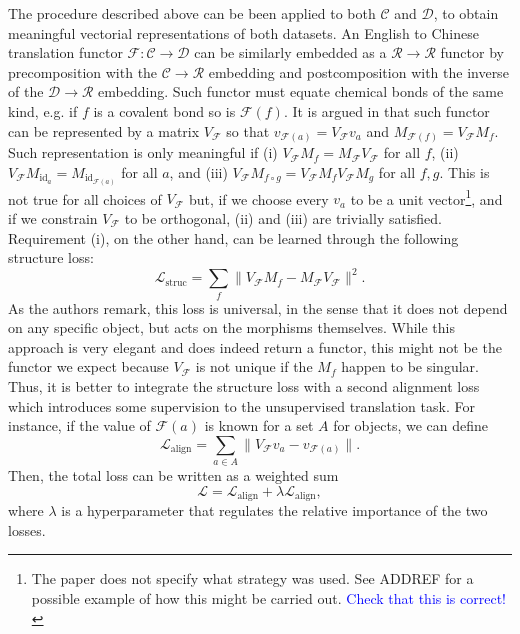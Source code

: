 \documentclass[11pt,a4paper,openright,twoside]{report}
\theoremstyle{plain}
\theoremstyle{definition}
\begin{document}
The procedure described above can be been applied to both $\mathcal{C}$ and $\mathcal{D}$, to obtain meaningful vectorial representations of both datasets. An English to Chinese translation functor $\mathcal{F}: \mathcal{C} \to \mathcal{D}$ can be similarly embedded as a $\mathcal{R} \to \mathcal{R}$ functor by precomposition with the $\mathcal{C} \to \mathcal{R}$ embedding and postcomposition with the inverse of the $\mathcal{D} \to \mathcal{R}$ embedding. Such functor must equate chemical bonds of the same kind, e.g. if $f$ is a covalent bond so is $\mathcal{F}(f)$. It is argued in \cite{sheshmani2021categorical} that such functor can be represented by a matrix $V_\mathcal{F}$ so that $v_{\mathcal{F}(a)} =  V_\mathcal{F}v_a$ and $M_{\mathcal{F}(f)} = V_\mathcal{F}M_f$. Such representation is only meaningful if (i) $V_{\mathcal{F}}M_f = M_{\mathcal{F}}V_{\mathcal{F}}$ for all $f$, (ii) $V_{\mathcal{F}}M_{\mathrm{id}_a} = M_{\mathrm{id}_{\mathcal{F}(a)}}$ for all $a$, and (iii) $V_{\mathcal{F}}M_{f \circ g} = V_{\mathcal{F}}M_fV_{\mathcal{F}}M_g$ for all $f,g$. This is not true for all choices of  $V_\mathcal{F}$ but, if we choose every $v_a$ to be a unit vector\footnote{The paper does not specify what strategy was used. See ADDREF for a possible example of how this might be carried out. \textcolor{blue}{Check that this is correct!}}, and if we constrain $V_{\mathcal{F}}$ to be orthogonal, (ii) and (iii) are trivially satisfied. Requirement (i), on the other hand, can be learned through the following structure loss:
\[\mathcal{L}_{\mathrm{struc}} = \sum_{f}\|V_{\mathcal{F}}M_f - M_{\mathcal{F}}V_{\mathcal{F}}\|^2.\]
As the authors remark, this loss is universal, in the sense that it does not depend on any specific object, but acts on the morphisms themselves. While this approach is very elegant and does indeed return a functor, this might not be the functor we expect because $V_{\mathcal{F}}$ is not unique if the $M_f$ happen to be singular. Thus, it is better to integrate the structure loss with a second alignment loss which introduces some supervision to the unsupervised translation task. For instance, if the value of $\mathcal{F}(a)$ is known for a set $A$ for objects, we can define
\[\mathcal{L}_{\mathrm{align}} = \sum_{a \in A}\|V_{\mathcal{F}}v_a - v_{\mathcal{F}(a)}\|.\]
Then, the total loss can be written as a weighted sum 
\begin{equation}
  \label{eq: sumoflosses2}
  \mathcal{L} = \mathcal{L}_{\mathrm{align}} + \lambda \mathcal{L}_{\mathrm{align}},
\end{equation}
where $\lambda$ is a hyperparameter that regulates the relative importance of the two losses.
\end{document}
